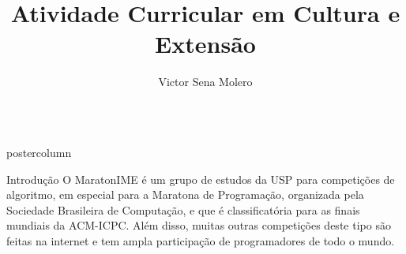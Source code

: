 \documentclass[final]{beamer}
\title{\huge Atividade Curricular em Cultura e Extensão}
\author{Victor Sena Molero}
\institute[Universidade de São Paulo] %
{
    Instituto de Matemática e Estatística, Universidade de São Paulo
}
\date{}
\newlength{\columnheight}
\begin{document}
\begin{frame}
\begin{columns}
\begin{column}{.5\textwidth}
\begin{beamercolorbox}[center,wd=\textwidth]{postercolumn}
\begin{minipage}[T]{.95\textwidth} %
\parbox[t][\columnheight]{\textwidth}{ %
    \begin{block}{Introdução}
        O MaratonIME é um grupo de estudos da USP para competições de algoritmo, em especial para a Maratona de Programação, organizada pela Sociedade Brasileira de Computação, e que é classificatória para as finais mundiais da ACM-ICPC. Além disso, muitas outras competições deste tipo são feitas na internet e tem ampla participação de programadores de todo o mundo.
    \end{block}

}
\end{minipage}
\end{beamercolorbox}
\end{column}
\end{columns}
\end{frame}
\end{document}
